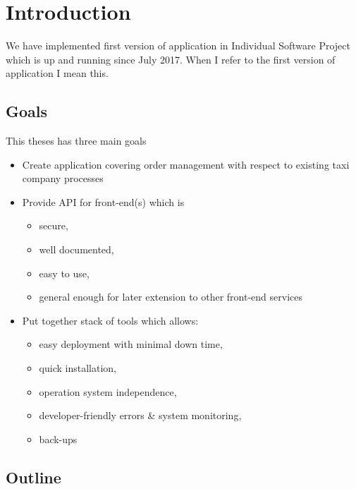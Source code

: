 \chapter{Introduction}


We have implemented first version of application in Individual Software Project which is up and running since July 2017. When I refer to the first version of application I mean this.
\section{Goals}
This theses has three main goals
\begin{itemize}
	\item Create application covering order management with respect to existing taxi company processes
	\item Provide API for front-end(s) which is
	\begin{itemize}
		\item secure,
		\item well documented,
		\item easy to use,
		\item general enough for later extension to other front-end services
	\end{itemize}
	\item Put together stack of tools which allows:
	\begin{itemize}
		\item easy deployment with minimal down time,
		\item quick installation,
		\item operation system independence,
		\item developer-friendly errors \& system monitoring,
		\item back-ups
	\end{itemize}
\end{itemize}

\section{Outline}